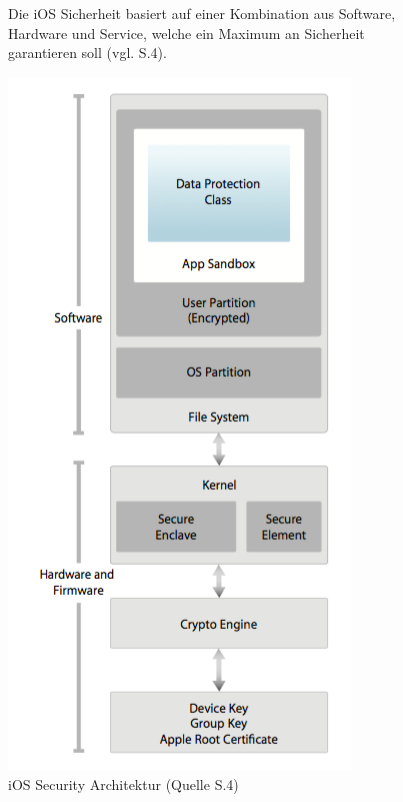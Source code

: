\begin{figure}[htb]
\begin{minipage}{0.6\textwidth}
\begin{description}
   		\end{description}
Die iOS Sicherheit basiert auf einer Kombination aus Software, Hardware und Service, welche ein Maximum an Sicherheit garantieren soll (vgl. \cite{Apple[4]} S.4).
	\end{minipage}
	\hfil
	\begin{minipage}{0.4\textwidth}
		\includegraphics[width=\textwidth]{Bilder/Chapter3_SecArchitektur}
		\caption {iOS Security Architektur (Quelle \cite{Apple[4]} S.4)}
        \label{fig:iOS Security Architektur}
	\end{minipage}
\end{figure}
		    	
